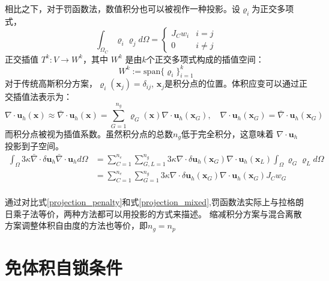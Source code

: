 相比之下，对于罚函数法，数值积分也可以被视作一种投影。设$\varrho_i$为正交多项式，
\begin{equation}
    \int_{\Omega_C} \varrho_i \varrho_j d\Omega = 
    \begin{cases}
        J_C w_i  & i = j \\
        0 & i \ne j
    \end{cases}
\end{equation}
正交插值 $T^{k}: V \rightarrow W^{k}$，其中 $W^{k}$ 是由$k$个正交多项式构成的插值空间：
\begin{equation}
    W^{k}:= \mathrm{span}\{\varrho_i \}_{i=1}^{k}
\end{equation}
对于传统高斯积分方案，$\varrho_i(\boldsymbol x_j) = \delta_{ij}$, $\boldsymbol x_j$是积分点的位置。体积应变可以通过正交插值法表示为：
\begin{equation}
    \nabla \cdot \boldsymbol u_h(\boldsymbol x) \approx \bar \nabla \cdot \boldsymbol u_h(\boldsymbol x) = \sum_{G=1}^{n_g} \varrho_G(\boldsymbol x) \nabla \cdot \boldsymbol u_h(\boldsymbol x_G), \quad \nabla \cdot \boldsymbol u_h(\boldsymbol x_G) = \bar \nabla \cdot \boldsymbol u_h(\boldsymbol x_G)
\end{equation}
而积分点被视为插值系数。虽然积分点的总数$n_g$低于完全积分，这意味着 $\nabla \cdot \boldsymbol u_h$ 投影到子空间。
\begin{equation}\label{projection_penalty}
    \begin{split}
        \int_\Omega 3\kappa \bar \nabla \cdot \delta \boldsymbol u_h \bar \nabla \cdot \boldsymbol u_h d\Omega
        &= \sum_{C=1}^{n_e} \sum_{G,L=1}^{n_g} 3\kappa \nabla \cdot \delta \boldsymbol u_h(\boldsymbol x_G) \nabla \cdot \boldsymbol u_h(\boldsymbol x_L) \int_\Omega \varrho_G \varrho_L d\Omega  \\
        &= \sum_{C=1}^{n_e} \sum_{G=1}^{n_g} 3\kappa \nabla \cdot \delta \boldsymbol u_h(\boldsymbol x_G) \nabla \cdot \boldsymbol u_h(\boldsymbol x_G) J_C w_G \\
    \end{split}
\end{equation}

通过对比式\eqref{projection_penalty}和式\eqref{projection_mixed},罚函数法实际上与拉格朗日乘子法等价，两种方法都可以用投影的方式来描述。
缩减积分方案与混合离散方案调整体积自由度的方法也等价，即$n_g=n_p$

\section{免体积自锁条件}
